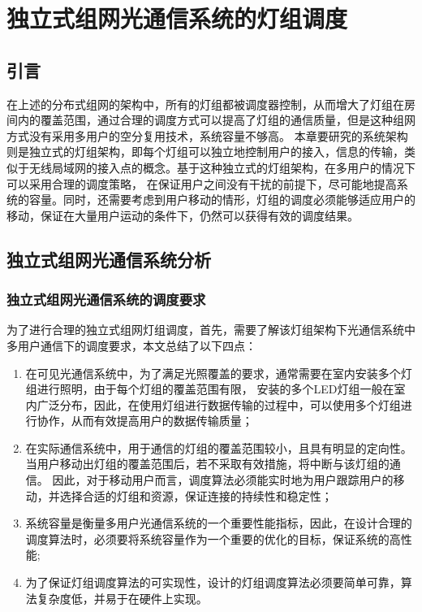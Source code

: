 
\chapter{独立式组网光通信系统的灯组调度}\label{chap:independent-led-design}
\section{引言}
在上述的分布式组网的架构中，所有的灯组都被调度器控制，从而增大了灯组在房间内的覆盖范围，通过合理的调度方式可以提高了灯组的通信质量，但是这种组网方式没有采用多用户的空分复用技术，系统容量不够高。
本章要研究的系统架构则是独立式的灯组架构，即每个灯组可以独立地控制用户的接入，信息的传输，类似于无线局域网的接入点的概念。基于这种独立式的灯组架构，在多用户的情况下可以采用合理的调度策略，
在保证用户之间没有干扰的前提下，尽可能地提高系统的容量。同时，还需要考虑到用户移动的情形，灯组的调度必须能够适应用户的移动，保证在大量用户运动的条件下，仍然可以获得有效的调度结果。

\section{独立式组网光通信系统分析}\label{sec:analysis}
\subsection{独立式组网光通信系统的调度要求}
为了进行合理的独立式组网灯组调度，首先，需要了解该灯组架构下光通信系统中多用户通信下的调度要求，本文总结了以下四点：

\begin{enumerate}
    \item 在可见光通信系统中，为了满足光照覆盖的要求，通常需要在室内安装多个灯组进行照明，由于每个灯组的覆盖范围有限，
        安装的多个LED灯组一般在室内广泛分布，因此，在使用灯组进行数据传输的过程中，可以使用多个灯组进行协作，从而有效提高用户的数据传输质量；
    \item 在实际通信系统中，用于通信的灯组的覆盖范围较小，且具有明显的定向性。当用户移动出灯组的覆盖范围后，若不采取有效措施，将中断与该灯组的通信。
        因此，对于移动用户而言，调度算法必须能实时地为用户跟踪用户的移动，并选择合适的灯组和资源，保证连接的持续性和稳定性；
    \item 系统容量是衡量多用户光通信系统的一个重要性能指标，因此，在设计合理的调度算法时，必须要将系统容量作为一个重要的优化的目标，保证系统的高性能;
    \item 为了保证灯组调度算法的可实现性，设计的灯组调度算法必须要简单可靠，算法复杂度低，并易于在硬件上实现。
\end{enumerate}


